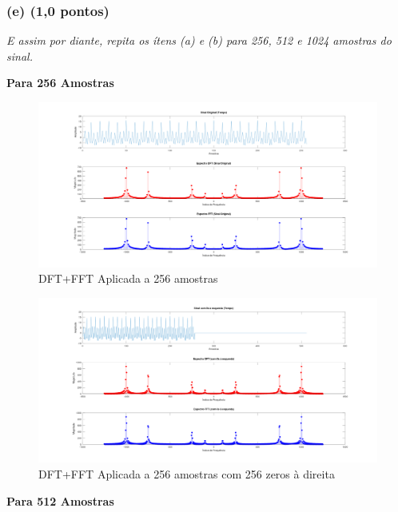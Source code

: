\subsubsection*{(e) \textbf{(1,0 pontos)}}
\textit{E assim por diante, repita os ítens (a) e (b) para 256, 512 e 1024 amostras do sinal.}

\textbf{Para 256 Amostras}

\begin{figure}[H]
    \centering
    \includegraphics[width=1\linewidth]{03_experimental_analysis//assets/plot_results/256_samples_dft_fft.png}
    \caption{DFT+FFT Aplicada a 256 amostras}
    \label{fig:signal_256samples_fft-dft}
\end{figure}

\begin{figure}[H]
    \centering
    \includegraphics[width=1\linewidth]{03_experimental_analysis//assets/plot_results/256_samples_dft_fft_padded.png}
    \caption{DFT+FFT Aplicada a 256 amostras com 256 zeros à direita}
    \label{fig:signal_256samples_fft-dft_padded}
\end{figure}

\textbf{Para 512 Amostras}

